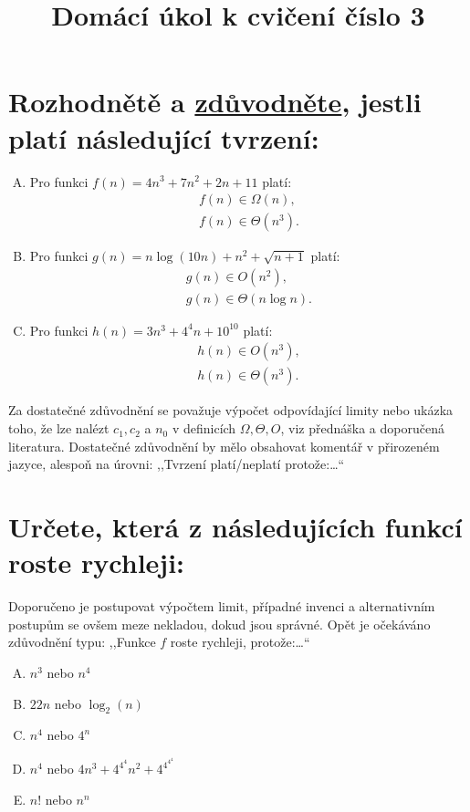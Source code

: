 \documentclass[12pt,oneside]{article}
\title{Domácí úkol k cvičení číslo 3}
\author{\vspace{-1em}}
\begin{document}
	\maketitle
	\section{Rozhodnětě a \underline{zdůvodněte}, jestli platí následující tvrzení:}
	\begin{enumerate}[A)]
		\item Pro funkci $f(n) = 4n^3 + 7n^2 + 2n + 11$ platí:
		\begin{align}
			f(n) \in \Omega(n), \\
			f(n) \in \Theta(n^3).
		\end{align}
		\vspace{2cm}
		\item Pro funkci $g(n) = n\log(10n) + n^2 + \sqrt{n + 1}$ platí:
		\begin{align}
			g(n) \in O(n^2), \\
			g(n) \in \Theta(n\log n).
		\end{align}
		\vspace{2cm}
		\item Pro funkci $h(n) = 3n^3 + 4^4n + 10^{10} $ platí:
		\begin{align}
			h(n) \in O(n^3) ,\\
			h(n) \in \Theta(n^3).
		\end{align}
	\end{enumerate}
	\vspace{2cm}
	Za dostatečné zdůvodnění se považuje výpočet odpovídající limity nebo ukázka toho, že lze nalézt $c_1, c_2$ a $n_0$ v definicích $\Omega, \Theta, O$, viz přednáška a doporučená literatura.
	Dostatečné zdůvodnění by mělo obsahovat komentář v přirozeném jazyce, alespoň na úrovni: ,,Tvrzení platí/neplatí protože:\dots``

	\section{Určete, která z následujících funkcí roste rychleji:}
	Doporučeno je postupovat výpočtem limit, případné invenci a alternativním postupům se ovšem meze nekladou, dokud jsou správné.
	Opět je očekáváno zdůvodnění typu: ,,Funkce $f$ roste rychleji, protože:\dots``
	\begin{enumerate}[A), itemsep=2.5em]
		\item $n^3$ nebo $n^4$
		\item $22n$ nebo $\log_2(n)$
		\item $n^{4}$ nebo $4^n$
		\item $n^4$ nebo $4n^3 + 4^{4^4}n^2 + 4^{4^{4^4}}$
		\item $n!$ nebo $n^n$
	\end{enumerate}
\end{document}
